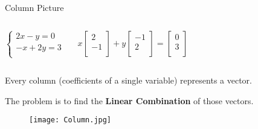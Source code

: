 \documentclass{beamer}
\begin{document}
\begin{frame}{Column Picture}
\begin{columns}
\begin{equation*}
    \begin{cases}
	2x-y=0\\
	-x+2y=3\\
\end{cases}
\end{equation*}

\vspace{-9pt}
\begin{equation*}
    x\left[ \begin{array}{c}
	2\\
	-1\\
\end{array} \right] +y\left[ \begin{array}{c}
	-1\\
	2\\
\end{array} \right] =\left[ \begin{array}{c}
	0\\
	3\\
\end{array} \right]
\end{equation*}
\end{columns}

\vspace{4pt}
Every column (coefficients of a single variable) represents a vector.

The problem is to find the \textbf{Linear Combination} of those vectors.
\vspace{-1.03pt}

\begin{figure}
    \centering
    \texttt{[image: Column.jpg]}
\end{figure}

\end{frame}
\end{document}
